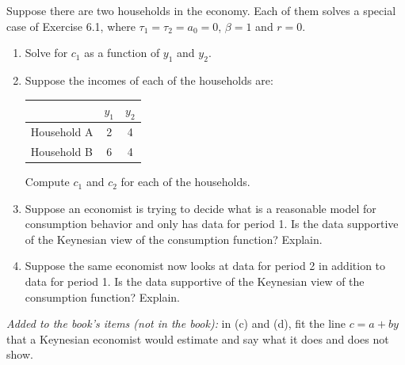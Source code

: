\noindent Suppose there are two households in the economy. Each of them solves a special case of Exercise 6.1, where
$\tau_1=\tau_2=a_0=0$, $\beta=1$ and $r=0$.
\begin{enumerate}[label=(\alph*),leftmargin=2.2em,topsep=2pt,itemsep=1pt]
\item Solve for $c_1$ as a function of $y_1$ and $y_2$.
\item Suppose the incomes of each of the households are:
\begin{center}\small
\begin{tabular}{@{}lcc@{}}
\toprule
 & $y_1$ & $y_2$ \\
\midrule
Household A & 2 & 4 \\
Household B & 6 & 4 \\
\bottomrule
\end{tabular}
\end{center}
Compute $c_1$ and $c_2$ for each of the households.
\item Suppose an economist is trying to decide what is a reasonable model for consumption behavior and only has data for period 1. Is
the data supportive of the Keynesian view of the consumption function? Explain.
\item Suppose the same economist now looks at data for period 2 in addition to data for period 1. Is the data supportive of the
Keynesian view of the consumption function? Explain.
\end{enumerate}
\noindent\textit{Added to the book's items (not in the book):} in (c) and (d), fit the line $c=a+by$ that a Keynesian economist would
estimate and say what it does and does not show.
\resolespaco

